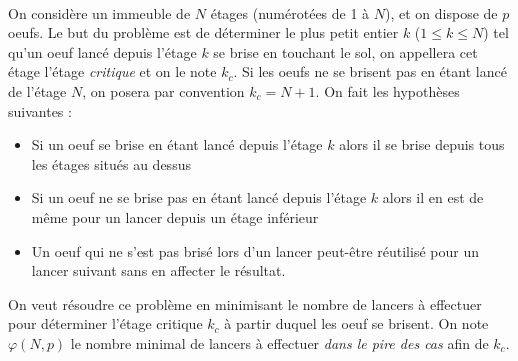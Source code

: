 \documentclass[11pt,a4paper]{article}
\begin{document}
\begin{Exercise}[title = {Problème du lâcher d'oeuf}] \\
    On considère un immeuble de $N$ étages (numérotées de 1 à $N$), et on dispose de $p$ oeufs. Le but du problème est de déterminer le plus petit entier $k$ ($1 \leq k \leq N$) tel qu'un oeuf  lancé depuis l'étage $k$ se brise en touchant le sol, on appellera cet étage l'étage \textit{critique} et on le note $k_c$. Si les oeufs ne se brisent pas en étant lancé de l'étage $N$, on posera par convention $k_c = N+1$. On fait les hypothèses suivantes : 
    \begin{itemize}
        \item Si un oeuf se brise en étant lancé depuis l'étage $k$ alors il se brise depuis tous les étages situés au dessus 
        \item Si un oeuf ne se brise pas en étant lancé depuis l'étage $k$ alors il en est de même pour un lancer depuis un étage inférieur
        \item Un oeuf qui ne s'est pas brisé lors d'un lancer peut-être réutilisé pour un lancer suivant sans en affecter le résultat.
    \end{itemize}
    On veut résoudre ce problème en minimisant le nombre de lancers à effectuer pour déterminer l'étage critique $k_c$ à partir duquel les oeuf se brisent. On note $\varphi(N, p)$ le nombre minimal de lancers à effectuer \textit{dans le pire des cas} afin de $k_c$. 
\end{Exercise}
\end{document}

